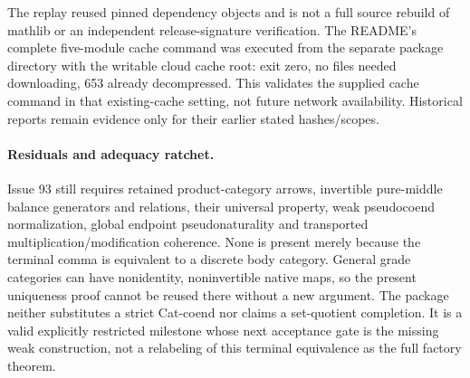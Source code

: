 \documentclass{article}
\begin{document}
The replay reused pinned dependency objects and is not a full source rebuild of mathlib or an independent release-signature verification. The README's complete five-module cache command was executed from the separate package directory with the writable cloud cache root: exit zero, no files needed downloading, 653 already decompressed. This validates the supplied cache command in that existing-cache setting, not future network availability. Historical reports remain evidence only for their earlier stated hashes/scopes.

\paragraph{Residuals and adequacy ratchet.}
Issue 93 still requires retained product-category arrows, invertible pure-middle balance generators and relations, their universal property, weak pseudocoend normalization, global endpoint pseudonaturality and transported multiplication/modification coherence. None is present merely because the terminal comma is equivalent to a discrete body category. General grade categories can have nonidentity, noninvertible native maps, so the present uniqueness proof cannot be reused there without a new argument. The package neither substitutes a strict Cat-coend nor claims a set-quotient completion. It is a valid explicitly restricted milestone whose next acceptance gate is the missing weak construction, not a relabeling of this terminal equivalence as the full factory theorem.
\end{document}
